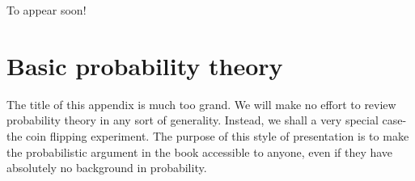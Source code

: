 \documentclass[]{stml-l}
\numberwithin{equation}{chapter}
\theoremstyle{plain}
\theoremstyle{definition}
\theoremstyle{remark}
\begin{document}
To appear soon!

\chapter{Basic probability theory} \label{prob.append}

The title of this appendix is much too grand. We will make no effort to review probability theory in any sort of generality. Instead, we shall a very special case- the coin flipping experiment. The purpose of this style of presentation is to make the probabilistic argument in the book accessible to anyone, even if they have absolutely no background in probability. 





\backmatter
\end{document}
